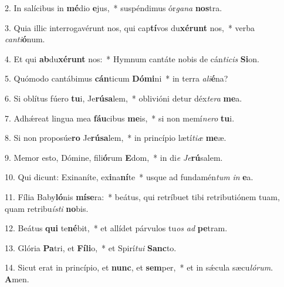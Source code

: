 2. In salícibus in \textbf{mé}dio \textbf{e}jus,~*  suspéndimus ór\textit{ga}\textit{na} \textbf{nos}tra.\

3. Quia illic interrogavérunt nos, qui cap\textbf{tí}vos du\textbf{xé}\textbf{runt} nos,~*  verba \textit{can}\textit{ti}\textbf{ó}num.\

4. Et qui \textbf{ab}du\textbf{xé}\textbf{runt} nos:~*  Hymnum cantáte nobis de cán\textit{ti}\textit{cis} \textbf{Si}on.\

5. Quómodo cantábimus \textbf{cán}ticum \textbf{Dó}\textbf{mi}ni~*  in terra \textit{a}\textit{li}\textbf{é}na?\

6. Si oblítus fúero \textbf{tu}i, Je\textbf{rú}\textbf{sa}lem,~*  oblivióni detur déx\textit{te}\textit{ra} \textbf{me}a.\

7. Adhǽreat lingua mea \textbf{fáu}cibus \textbf{me}is,~*  si non memí\textit{ne}\textit{ro} \textbf{tu}i.\

8. Si non proposúe\textbf{ro} Je\textbf{rú}\textbf{sa}lem,~*  in princípio lætí\textit{ti}\textit{æ} \textbf{me}æ.\

9. Memor esto, Dómine, fili\textbf{ó}rum \textbf{E}dom,~*  in di\textit{e} \textit{Je}\textbf{rú}salem.\

10. Qui dicunt: Exinaníte, ex\textbf{i}na\textbf{ní}te~*  usque ad fundamén\textit{tum} \textit{in} \textbf{e}a.\

11. Fília Baby\textbf{ló}nis \textbf{mí}\textbf{se}ra:~*  beátus, qui retríbuet tibi retributiónem tuam, quam retribu\textit{ís}\textit{ti} \textbf{no}bis.\

12. Beátus \textbf{qui} te\textbf{né}bit,~*  et allídet párvulos tu\textit{os} \textit{ad} \textbf{pe}tram.\

13. Glória \textbf{Pa}tri, et \textbf{Fí}\textbf{li}o,~*  et Spirí\textit{tu}\textit{i} \textbf{Sanc}to.\

14. Sicut erat in princípio, et \textbf{nunc}, et \textbf{sem}per,~*  et in sǽcula sæcu\textit{ló}\textit{rum}. \textbf{A}men.\

